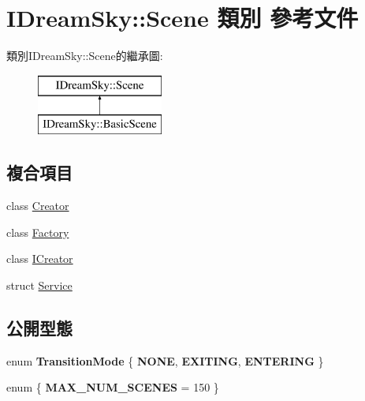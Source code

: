 \hypertarget{class_i_dream_sky_1_1_scene}{}\section{I\+Dream\+Sky\+:\+:Scene 類別 參考文件}
\label{class_i_dream_sky_1_1_scene}
類別\+I\+Dream\+Sky\+:\+:Scene的繼承圖\+:\begin{figure}[H]
\begin{center}
\leavevmode
\includegraphics[height=2.000000cm]{class_i_dream_sky_1_1_scene}
\end{center}
\end{figure}
\subsection*{複合項目}
\begin{DoxyCompactItemize}
\item 
class \hyperlink{class_i_dream_sky_1_1_scene_1_1_creator}{Creator}
\item 
class \hyperlink{class_i_dream_sky_1_1_scene_1_1_factory}{Factory}
\item 
class \hyperlink{class_i_dream_sky_1_1_scene_1_1_i_creator}{I\+Creator}
\item 
struct \hyperlink{struct_i_dream_sky_1_1_scene_1_1_service}{Service}
\end{DoxyCompactItemize}
\subsection*{公開型態}
\begin{DoxyCompactItemize}
\item 
enum {\bfseries Transition\+Mode} \{ {\bfseries N\+O\+NE}, 
{\bfseries E\+X\+I\+T\+I\+NG}, 
{\bfseries E\+N\+T\+E\+R\+I\+NG}
 \}\hypertarget{class_i_dream_sky_1_1_scene_a0882cde17c7381eee5667d8435dbe7fe}{}\label{class_i_dream_sky_1_1_scene_a0882cde17c7381eee5667d8435dbe7fe}

\item 
enum \{ {\bfseries M\+A\+X\+\_\+\+N\+U\+M\+\_\+\+S\+C\+E\+N\+ES} = 150
 \}\hypertarget{class_i_dream_sky_1_1_scene_ae942996cb6b89dc16deaf32d5584695c}{}\label{class_i_dream_sky_1_1_scene_ae942996cb6b89dc16deaf32d5584695c}

\end{DoxyCompactItemize}
